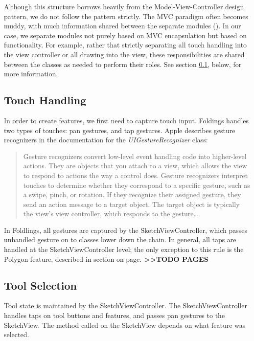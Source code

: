 Although this structure borrows heavily from the Model-View-Controller
design pattern, we do not follow the pattern strictly. The MVC paradigm
often becomes muddy, with much information shared between the separate
modules (\citet{veit2003model}). In our case, we separate modules not
purely based on MVC encapsulation but based on functionality. For
example, rather that strictly separating all touch handling into the
view controller or all drawing into the view, these responsibilities are
shared between the classes as needed to perform their roles. See section
\ref{touch-handling}, below, for more information.

\subsection{Touch Handling}\label{touch-handling}

In order to create features, we first need to capture touch input.
Foldings handles two types of touches: pan gestures, and tap gestures.
Apple describes gesture recognizers in the documentation for the
\emph{UIGestureRecognizer} class:

\begin{quote}
Gesture recognizers convert low-level event handling code into
higher-level actions. They are objects that you attach to a view, which
allows the view to respond to actions the way a control does. Gesture
recognizers interpret touches to determine whether they correspond to a
specific gesture, such as a swipe, pinch, or rotation. If they recognize
their assigned gesture, they send an action message to a target object.
The target object is typically the view's view controller, which
responds to the gesture\ldots{}
\end{quote}

In Foldlings, all gestures are captured by the SketchViewController,
which passes unhandled gesture on to classes lower down the chain. In
general, all taps are handled at the SketchViewController level; the
only exception to this rule is the Polygon feature, described in section
on page. \textbf{\textgreater{}\textgreater{}TODO PAGES}

\subsection{Tool Selection}\label{tool-selection}

Tool state is maintained by the SketchViewController. The
SketchViewController handles taps on tool buttons and features, and
passes pan gestures to the SketchView. The method called on the
SketchView depends on what feature was selected.

